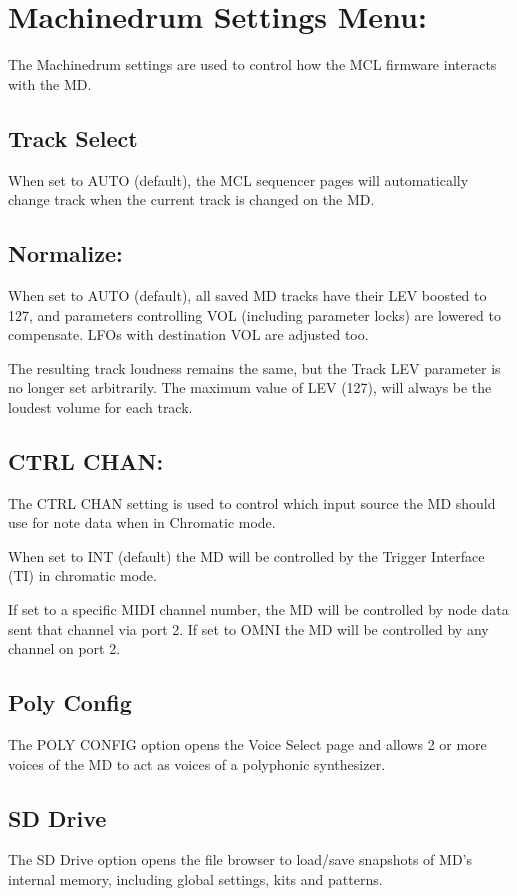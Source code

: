 \chapter{Machinedrum Settings Menu:}
The Machinedrum settings are used to control how the MCL firmware interacts with the MD.
\section{Track Select}
When set to AUTO (default), the MCL sequencer pages will automatically change track when the current track is changed on the MD.

\section{Normalize:}
When set to AUTO (default), all saved MD tracks have their LEV boosted to 127, and parameters controlling VOL (including parameter locks) are lowered
to compensate. LFOs with destination VOL are 
adjusted too.

The resulting track loudness remains the same, but the Track LEV parameter is no longer set arbitrarily. The maximum value of LEV (127), will always be the loudest volume for each track.
\section{CTRL CHAN:}
The CTRL CHAN setting is used to control which input  source the MD should use for note data when in Chromatic mode.

When set to INT (default) the MD will be controlled by the Trigger Interface (TI) in chromatic mode.

If set to a specific MIDI channel number, the MD will be controlled by node data sent that channel via port 2. If set to OMNI the MD will be controlled by any channel on port 2.
\section{Poly Config}
The POLY CONFIG option opens the Voice Select page and allows 2 or more voices of the MD to act as voices of a polyphonic synthesizer.
\section{SD Drive}
The SD Drive option opens the file browser to load/save snapshots of MD's internal memory, including global settings, kits and patterns.